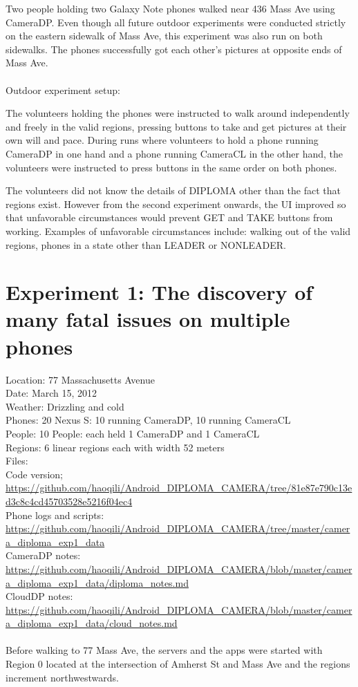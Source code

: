Two people holding two Galaxy Note phones walked near 436 Mass Ave using CameraDP. Even though all future outdoor experiments were conducted strictly on the eastern sidewalk of Mass Ave, this experiment was also run on both sidewalks. The phones successfully got each other's pictures at opposite ends of Mass Ave.
\\
\\
Outdoor experiment setup:

The volunteers holding the phones were instructed to walk around independently and freely in the valid regions, pressing buttons to take and get pictures at their own will and pace. During runs where volunteers to hold a phone running CameraDP in one hand and a phone running CameraCL in the other hand, the volunteers were instructed to press buttons in the same order on both phones.

The volunteers did not know the details of DIPLOMA other than the fact that regions exist. However from the second experiment onwards, the UI improved so that unfavorable circumstances would prevent GET and TAKE buttons from working. Examples of unfavorable circumstances include: walking out of the valid regions, phones in a state other than LEADER or NONLEADER.


\section{Experiment 1: The discovery of many fatal issues on multiple phones}

Location: 77 Massachusetts Avenue\\
Date: March 15, 2012\\
Weather: Drizzling and cold\\
Phones: 20 Nexus S: 10 running CameraDP, 10 running CameraCL\\
People: 10 People: each held 1 CameraDP and 1 CameraCL\\
Regions: 6 linear regions each with width 52 meters\\
Files:\\
Code version; {\url{https://github.com/haoqili/Android_DIPLOMA_CAMERA/tree/81e87e790c13ed3c8c4cd45703528e5216f04ec4}}\\
Phone logs and scripts: {\url{https://github.com/haoqili/Android_DIPLOMA_CAMERA/tree/master/camera_diploma_exp1_data}}\\ 
CameraDP notes: {\url{https://github.com/haoqili/Android_DIPLOMA_CAMERA/blob/master/camera_diploma_exp1_data/diploma_notes.md}}\\
CloudDP notes: {\url{https://github.com/haoqili/Android_DIPLOMA_CAMERA/blob/master/camera_diploma_exp1_data/cloud_notes.md}}\\
\\
Before walking to 77 Mass Ave, the servers and the apps were started with Region 0 located at the intersection of Amherst St and Mass Ave and the regions increment northwestwards.

